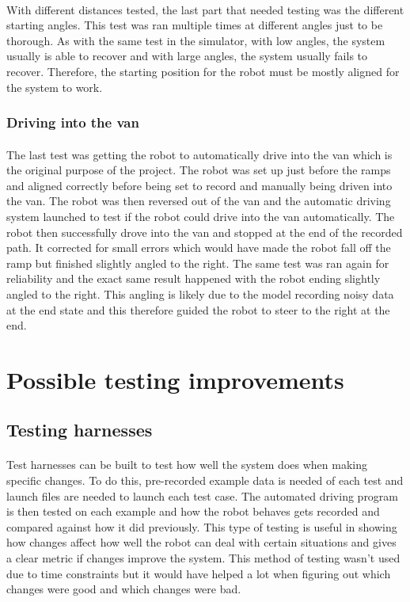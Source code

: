 \paragraph{}
With different distances tested, the last part that needed testing was the different starting angles. This test was ran multiple times at different angles just to be thorough. As with the same test in the simulator, with low angles, the system usually is able to recover and with large angles, the system usually fails to recover. Therefore, the starting position for the robot must be mostly aligned for the system to work.

\subsubsection{Driving into the van}
\paragraph{}
The last test was getting the robot to automatically drive into the van which is the original purpose of the project. The robot was set up just before the ramps and aligned correctly before being set to record and manually being driven into the van. The robot was then reversed out of the van and the automatic driving system launched to test if the robot could drive into the van automatically. The robot then successfully drove into the van and stopped at the end of the recorded path. It corrected for small errors which would have made the robot fall off the ramp but finished slightly angled to the right. The same test was ran again for reliability and the exact same result happened with the robot ending slightly angled to the right. This angling is likely due to the model recording noisy data at the end state and this therefore guided the robot to steer to the right at the end.

\section{Possible testing improvements}
\subsection{Testing harnesses}
\paragraph{}
Test harnesses can be built to test how well the system does when making specific changes. To do this, pre-recorded example data is needed of each test and launch files are needed to launch each test case. The automated driving program is then tested on each example and how the robot behaves gets recorded and compared against how it did previously. This type of testing is useful in showing how changes affect how well the robot can deal with certain situations and gives a clear metric if changes improve the system. This method of testing wasn't used due to time constraints but it would have helped a lot when figuring out which changes were good and which changes were bad.


